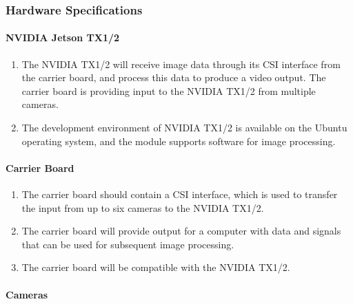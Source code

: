 \documentclass[letterpaper,10pt,serif,draftclsnofoot,onecolumn,compsoc,titlepage]{IEEEtran}
\begin{document}
\subsubsection{Hardware Specifications}

\paragraph{NVIDIA Jetson TX1/2}

\begin{enumerate}[label=\alph*]
	\item The NVIDIA TX1/2 will receive image data through its CSI interface from
	the carrier board, and process this data to produce a video output. The carrier
	board is providing input to the NVIDIA TX1/2 from multiple cameras. \\
	\item The development environment of NVIDIA TX1/2 is available on the Ubuntu 
	operating system, and the module supports software for image processing.\\ 
	\end{enumerate}

\paragraph{Carrier Board}

\begin{enumerate}[label=\alph*]
	\item The carrier board should contain a CSI interface, which is used to transfer the
	input from up to six cameras to the NVIDIA TX1/2. \\
	\item The carrier board will provide output for a computer with data and signals that 
	can be used for subsequent image processing.\\
	\item The carrier board will be compatible with the NVIDIA TX1/2.\\
\end{enumerate}

\paragraph{Cameras}
\end{document}
